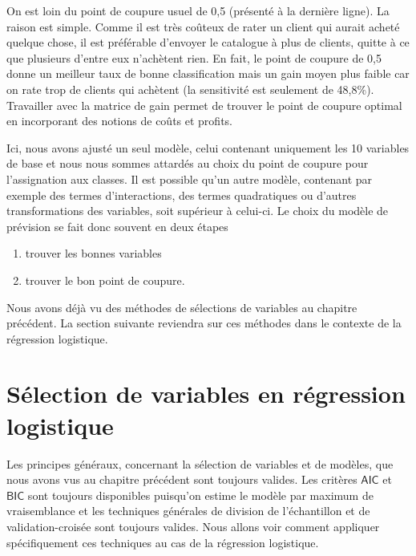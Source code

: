 \documentclass[
  11pt,
  letterpaper,
]{book}
\providecommand{\tightlist}{%
  \setlength{\itemsep}{0pt}\setlength{\parskip}{0pt}}
\theoremstyle{definition}
\theoremstyle{definition}
\theoremstyle{definition}
\theoremstyle{remark}
\begin{document}
On est loin du point de coupure usuel de 0,5 (présenté à la dernière ligne). La raison est simple. Comme il est très coûteux de rater un client qui aurait acheté quelque chose, il est préférable d'envoyer le catalogue à plus de clients, quitte à ce que plusieurs d'entre eux n'achètent rien. En fait, le point de coupure de 0,5 donne un meilleur taux de bonne classification mais un gain moyen plus faible car on rate trop de clients qui achètent (la sensitivité est seulement de 48,8\%). Travailler avec la matrice de gain permet de trouver le point de coupure optimal en incorporant des notions de coûts et profits.

Ici, nous avons ajusté un seul modèle, celui contenant uniquement les 10 variables de base et nous nous sommes attardés au choix du point de coupure pour l'assignation aux classes. Il est possible qu'un autre modèle, contenant par exemple des termes d'interactions, des termes quadratiques ou d'autres transformations des variables, soit supérieur à celui-ci. Le choix du modèle de prévision se fait donc souvent en deux étapes

\begin{enumerate}
\def\labelenumi{\arabic{enumi}.}
\tightlist
\item
  trouver les bonnes variables
\item
  trouver le bon point de coupure.
\end{enumerate}

Nous avons déjà vu des méthodes de sélections de variables au chapitre précédent. La section suivante reviendra sur ces méthodes dans le contexte de la régression logistique.

\hypertarget{suxe9lection-de-variables-en-ruxe9gression-logistique}{%
\section{Sélection de variables en régression logistique}\label{suxe9lection-de-variables-en-ruxe9gression-logistique}}

Les principes généraux, concernant la sélection de variables et de modèles, que nous avons vus au chapitre précédent sont toujours valides. Les critères \(\mathsf{AIC}\) et \(\mathsf{BIC}\) sont toujours disponibles puisqu'on estime le modèle par maximum de vraisemblance et les techniques générales de division de l'échantillon et de validation-croisée sont toujours valides. Nous allons voir comment appliquer spécifiquement ces techniques au cas de la régression logistique.
\end{document}

